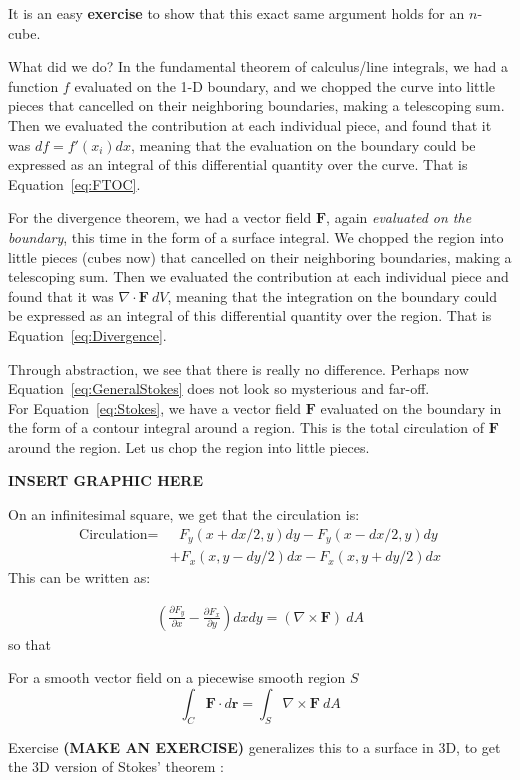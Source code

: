 	It is an easy \textbf{exercise} to show that this exact same argument holds for an $n$-cube. 
	
	What did we do? In the fundamental theorem of calculus/line integrals, we had a function $f$ evaluated on the 1-D boundary, and we chopped the curve into little pieces that cancelled on their neighboring boundaries, making a telescoping sum. Then we evaluated the contribution at each individual piece, and found that it was $df = f'(x_i) dx$, meaning that the evaluation on the boundary could be expressed as an integral of this differential quantity over the curve. That is Equation~\eqref{eq:FTOC}.
	
	For the divergence theorem, we had a vector field $\mathbf F$, again \emph{evaluated on the boundary}, this time in the form of a surface integral. We chopped the region into little pieces (cubes now) that cancelled on their neighboring boundaries, making a telescoping sum. Then we evaluated the contribution at each individual piece and found that it was $\nabla \cdot \mathbf F ~ dV$, meaning that the integration on the boundary could  be expressed as an integral of this differential quantity over the region. That is Equation~\eqref{eq:Divergence}.
	
	
	Through abstraction, we see that there is really no difference. Perhaps now Equation~\eqref{eq:GeneralStokes} does not look so mysterious and far-off.\\
	
	For Equation~\eqref{eq:Stokes}, we have a vector field $\mathbf F$ evaluated on the boundary in the form of a contour integral around a region. This is the total circulation of $\mathbf{F}$ around the region. Let us chop the region into little pieces. 
	
	\textbf{INSERT GRAPHIC HERE}
	
	On an infinitesimal square, we get that the circulation is:
	\begin{align*}
		\text{Circulation} =& ~~~  F_y (x+dx/2,y) dy - F_y (x-dx/2,y) dy \\ &+  F_x (x,y-dy/2) dx - F_x (x,y+dy/2) dx
	\end{align*}
	This can be written as:
	
	\begin{align*}
		\left( \frac{\partial F_y}{\partial x} - \frac{\partial F_x}{\partial y} \right) dx dy = (\nabla \times \mathbf F) ~ dA
	\end{align*}
	so that
	\begin{theorem} For a smooth vector field on a piecewise smooth region $S$ 
		\begin{equation}
			\int_C \mathbf{F} \cdot d\mathbf r = \int_S \nabla \times \mathbf{F} ~ dA
		\end{equation}
	\end{theorem}
	Exercise \textbf{(MAKE AN EXERCISE)} generalizes this to a surface in 3D, to get the 3D version of Stokes' theorem :
	
